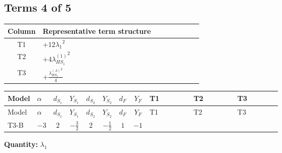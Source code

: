 \documentclass[8pt]{article}
\begin{document}
\begin{landscape}
\subsection*{Terms 4 of 5}
\begin{center}
\begin{tabular}{@{}c >{\raggedright\arraybackslash}p{0.82\linewidth}@{}}
\toprule
Column & Representative term structure \\
\midrule
T1 & \(\displaystyle +12 {\lambda_1}^2\) \\
\midrule
T2 & \(\displaystyle +4 {\lambda_{HS_1}^{(1)}}^2\) \\
\midrule
T3 & \(\displaystyle +\frac{{\lambda_{HS_1}^{(A)}}^2}{4}\) \\
\midrule
\bottomrule
\end{tabular}
\end{center}
\smallskip
\tiny
\begin{longtable}{@{}llcccccc >{\raggedright\arraybackslash}p{0.21\linewidth} >{\raggedright\arraybackslash}p{0.21\linewidth} >{\raggedright\arraybackslash}p{0.21\linewidth}@{}}
\toprule
Model & $\alpha$ & $d_{S_1}$ & $Y_{S_1}$ & $d_{S_2}$ & $Y_{S_2}$ & $d_F$ & $Y_F$ & T1 & T2 & T3 \\
\midrule
\endfirsthead
\toprule
Model & $\alpha$ & $d_{S_1}$ & $Y_{S_1}$ & $d_{S_2}$ & $Y_{S_2}$ & $d_F$ & $Y_F$ & T1 & T2 & T3 \\
\midrule
\endhead
T3-B & $-3$ & $2$ & $-\frac{3}{2}$ & $2$ & $-\frac{1}{2}$ & $1$ & $-1$ & \scriptsize\adjustbox{max width=\linewidth}{$\begin{gathered} +12 {\lambda_1}^2\end{gathered}$} & \scriptsize\adjustbox{max width=\linewidth}{$\begin{gathered} +4 {\lambda_{HS_1}^{(1)}}^2\end{gathered}$} & \scriptsize\adjustbox{max width=\linewidth}{$\begin{gathered} +\frac{{\lambda_{HS_1}^{(A)}}^2}{4}\end{gathered}$} \\
\midrule
\bottomrule
\end{longtable}
\clearpage
\noindent\textbf{Quantity: }$\lambda_1$\par\smallskip

\end{landscape}
\end{document}
